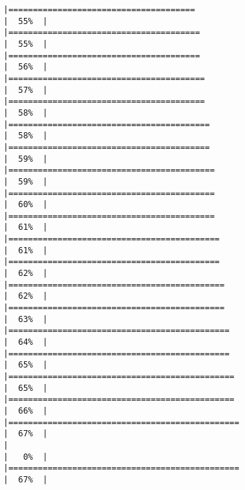 \documentclass[
]{article}
\begin{document}
\begin{verbatim}
|======================================                                |  55%  |                                                                              |=======================================                               |  55%  |                                                                              |=======================================                               |  56%  |                                                                              |========================================                              |  57%  |                                                                              |========================================                              |  58%  |                                                                              |=========================================                             |  58%  |                                                                              |=========================================                             |  59%  |                                                                              |==========================================                            |  59%  |                                                                              |==========================================                            |  60%  |                                                                              |==========================================                            |  61%  |                                                                              |===========================================                           |  61%  |                                                                              |===========================================                           |  62%  |                                                                              |============================================                          |  62%  |                                                                              |============================================                          |  63%  |                                                                              |=============================================                         |  64%  |                                                                              |=============================================                         |  65%  |                                                                              |==============================================                        |  65%  |                                                                              |==============================================                        |  66%  |                                                                              |===============================================                       |  67%  |                                                                              |                                                                      |   0%  |                                                                              |===============================================                       |  67%  |                                                                              
\end{verbatim}
\end{document}
